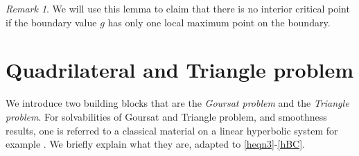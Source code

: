\documentclass[11pt]{amsart}
\theoremstyle{plain}
\theoremstyle{remark}
\newtheorem{Rem}[Thm]{Remark}
\numberwithin{equation}{section}
\numberwithin{Thm}{section}
\begin{document}
\begin{Rem}
We will use this lemma to claim that there is no interior critical point if the boundary value $g$ has only one local maximum point on the boundary.
\end{Rem}

\section{Quadrilateral and Triangle problem} \label{local}
We introduce two building blocks that are the {\it Goursat problem} and the {\it Triangle problem}. For solvabilities of Goursat and Triangle problem, and smoothness results, one is referred to a classical material on a linear hyperbolic system for example \cite[Chapter V. Section 6]{CH_2008}. We briefly explain what they are, adapted to \eqref{heqn3}-\eqref{hBC}.
\end{document}
